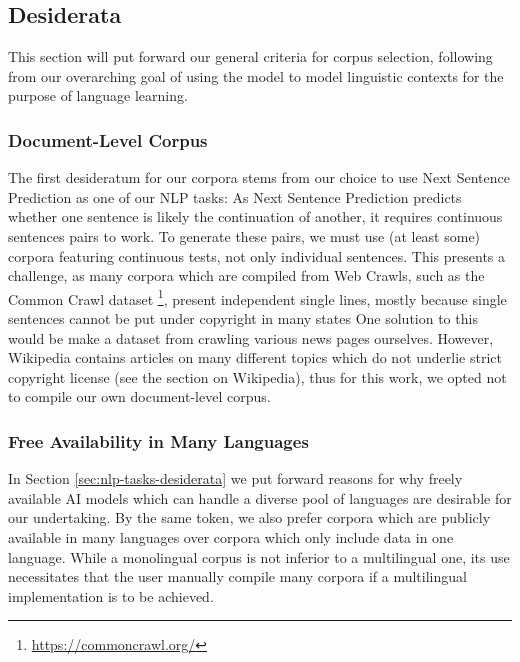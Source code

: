 \subsection{Desiderata}


This section will put forward our general criteria for corpus selection, following from our overarching goal of using the model to model linguistic contexts for the purpose of language learning.


\subsubsection{Document-Level Corpus} \label{sec:document-level-corpus}
The first desideratum for our corpora stems from our choice to use Next Sentence Prediction as one of our NLP tasks:
As Next Sentence Prediction predicts whether one sentence is likely the continuation of another, it requires continuous sentences pairs to work.
To generate these pairs, we must use (at least some) corpora featuring continuous tests, not only individual sentences.
This presents a challenge, as many corpora which are compiled from Web Crawls, such as the Common Crawl dataset \footnote{\url{https://commoncrawl.org/}}, present independent single lines, mostly because single sentences cannot be put under copyright in many states 
One solution to this would be make a dataset from crawling various news pages ourselves.
However, Wikipedia contains articles on many different topics which do not underlie strict copyright license (see the section on Wikipedia), thus for this work, we opted not to compile our own document-level corpus.

\subsubsection{Free Availability in Many Languages}
In Section \ref{sec:nlp-tasks-desiderata} we put forward reasons for why freely available AI models which can handle a diverse pool of languages are desirable for our undertaking.
By the same token, we also prefer corpora which are publicly available in many languages over corpora which only include data in one language.
While a monolingual corpus is not inferior to a multilingual one, its use necessitates that the user manually compile many corpora if a multilingual implementation is to be achieved.

